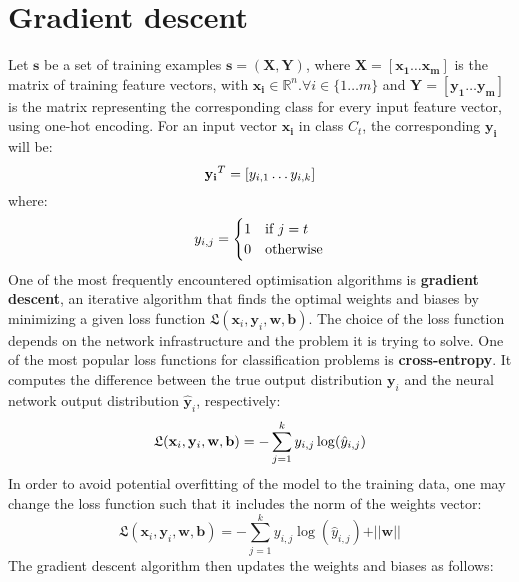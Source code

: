 \chapter{Gradient descent} \label{appendix-MLP-opt}

Let $\mathbf{s}$ be a set of training examples $\mathbf{s}=(\mathbf{X}, \mathbf{Y})$, where $\mathbf{X} = [\mathbf{x_1}\dots\mathbf{x_m}]$ is the matrix of training feature vectors, with $\mathbf{x_i}\in\mathbb{R}^n. \forall i \in \{1\dots m\}$ and $\mathbf{Y} = [\mathbf{y_1}\dots\mathbf{y_m}]$ is the matrix representing the corresponding class for every input feature vector, using one-hot encoding. For an input vector $\mathbf{x_i}$ in class $C_t$, the corresponding $\mathbf{y_i}$ will be:
\begin{equation}
\centering
\mathbf{y_i}^T = [y_{i, 1}\dots y_{i, k}]
\end{equation} 
where:
\begin{equation}
\centering
y_{i, j} = 
\begin{cases}
1 & \text{if } j = t \\
0 & \text{otherwise}
\end{cases}
\end{equation}
One of the most frequently encountered optimisation algorithms is \textbf{gradient descent}, an iterative algorithm that finds the optimal weights and biases by minimizing a given loss function $\mathfrak{L}(\mathbf{x}_i, \mathbf{y}_i, \mathbf{w}, \mathbf{b})$. The choice of the loss function depends on the network infrastructure and the problem it is trying to solve. One of the most popular loss functions for classification problems is \textbf{cross-entropy}. It computes the difference between the true output distribution $\mathbf{y}_i$ and the neural network output distribution $\mathbf{\hat{y}}_i$, respectively:
\begin{equation}
\centering
\mathfrak{L}(\mathbf{x}_i, \mathbf{y}_i, \mathbf{w}, \mathbf{b}) = -\sum_{j=1}^{k}y_{i,j}\log(\hat{y}_{i,j})
\end{equation}
In order to avoid potential overfitting of the model to the training data, one may change the loss function such that it includes the norm of the weights vector:
\begin{equation}
\mathfrak{L}(\mathbf{x}_i, \mathbf{y}_i, \mathbf{w}, \mathbf{b}) = -\sum_{j=1}^{k}y_{i,j}\log(\hat{y}_{i,j}) + \vert\vert \mathbf{w} \vert\vert
\end{equation} 
The gradient descent algorithm then updates the weights and biases as follows: 
